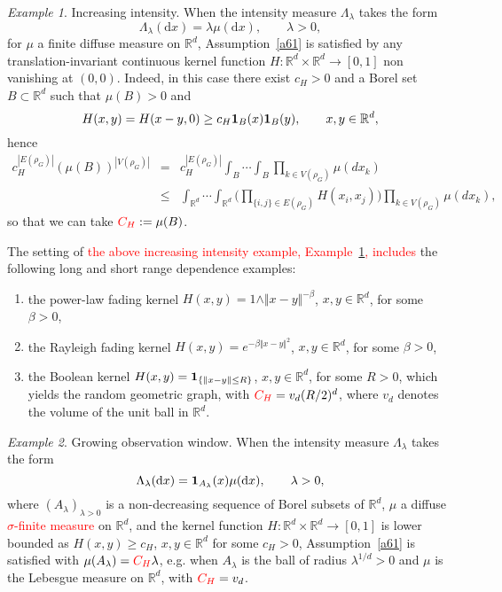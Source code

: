 \documentclass[bj,authoryear,noshowframe]{imsart}
\theoremstyle{plain}
\theoremstyle{remark}
\newtheorem*{example}{Example}
\newcommand{\R}{\mathbb{R}}
\newcommand{\bone}{{\bf 1}}
\def\real{{\mathord{\mathbb R}}}
\begin{document}
\noindent
\begin{example}
  \label{examplea}
  Increasing intensity. 
  When the intensity measure $\Lambda_\lambda$ takes the form 
$$\Lambda_\lambda (\mathrm{d}x)=\lambda\mu(\mathrm{d}x),\qquad\lambda>0,$$
 for $\mu$ a finite diffuse measure on $\R^d$, 
 Assumption~\ref{a61} is satisfied by any translation-invariant
 continuous kernel function $H : \real^d\times \real^d \to [0,1]$ non vanishing at $(0,0)$. 
 Indeed, in this case there exist $c_H>0$ and a Borel set $B\subset \real^d$
 such that $\mu ( B)>0$ and
$$
H(x,y) = H(x-y,0) \geq c_H \bone_B(x)\bone_B(y), \qquad x,y \in \real^d,
$$
hence 
\begin{eqnarray*} 
  c_H^{|E(\rho_G)|} ( \mu ( B ))^{|V(\rho_G)|} & = & 
  c_H^{|E(\rho_G)|}
  \int_B \cdots \int_B 
  \prod_{k\in V(\rho_G) } \mu (dx_k)
  \\
   & \leq &  
  \int_{\R^d}\cdots\int_{\R^d}
  \Bigg(
  \prod_{\{i,j\}\in E(\rho_G)} H(x_i,x_j)
  \Bigg)
  \prod_{k\in V(\rho_G) } \mu (dx_k), 
\end{eqnarray*}
so that we can take $\textcolor{red}{C_H} := \mu (B)$. 
\end{example}
The setting of \textcolor{red}{the above increasing intensity example, Example~\ref{examplea},
 includes} the following long and short range dependence examples: 
\begin{enumerate}%
\item
 the power-law fading kernel 
 $H(x,y) = 1 \wedge \Vert x - y \Vert^{- \beta}$, $x,y\in \real^d$, for some $\beta > 0$,  
\item
 the Rayleigh fading kernel $H(x,y) = e^{ - \beta \Vert x - y\Vert^2}$, $x,y\in \real^d$, for some $\beta > 0$, 
\item
 the Boolean kernel $H(x,y)=\bone_{\{\|x-y\|\leq R \}}$, $x,y\in \real^d$,
 for some $R >0$, which yields the random geometric graph, with
 $\textcolor{red}{C_H} = v_d (R /2)^d$,
 where $v_d$ denotes the volume of the unit ball in $\real^d$. 
\end{enumerate}
\begin{example}
  \label{exampleb}
  Growing observation window. 
  When the intensity measure $\Lambda_\lambda$ takes the form 
$$\Lambda_\lambda (\mathrm{d}x)= {\bf 1}_{A_\lambda} (x) \mu(\mathrm{d}x),\qquad\lambda>0,$$
  where $(A_\lambda )_{\lambda >0}$ is a non-decreasing sequence
  of Borel subsets of $\real^d$, 
  $\mu$ a %
  diffuse \textcolor{red}{$\sigma$-finite measure} on $\R^d$, 
  and the kernel function $H : \real^d\times \real^d \to [0,1]$
  is lower bounded as $H(x,y) \geq c_H$, $x,y\in \real^d$ for some $c_H>0$,
  Assumption~\ref{a61} is satisfied with 
  $\mu ( A_\lambda ) = \textcolor{red}{C_H} \lambda$,
  e.g. when $A_\lambda$ is  the ball of radius $\lambda^{1/d} >0$
  and $\mu$ is the Lebesgue measure on $\real^d$,
  with $\textcolor{red}{C_H} = v_d$. 
\end{example} 
\end{document}

